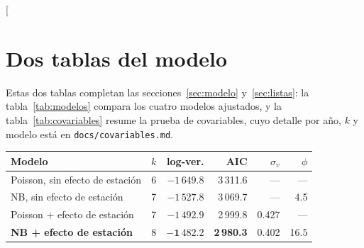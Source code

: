 \documentclass[conference]{IEEEtran}
\begin{document}
\twocolumn[{%
\section{Dos tablas del modelo}
\begin{center}
\begin{minipage}{0.86\textwidth}
\small Estas dos tablas completan las secciones~\ref{sec:modelo} y~\ref{sec:listas}: la tabla~\ref{tab:modelos} compara los cuatro modelos ajustados, y la tabla~\ref{tab:covariables} resume la prueba de covariables, cuyo detalle por año, $k$ y modelo está en \texttt{docs/covariables.md}.
\end{minipage}

\vspace{1.2em}
\begin{minipage}{0.62\textwidth}
\centering
{}
\label{tab:modelos}
\small\setlength\tabcolsep{4pt}
\begin{tabular}{@{}lrrrrr@{}}
\toprule
Modelo & $k$ & log-ver. & AIC & $\sigma_v$ & $\phi$ \\
\midrule
Poisson, sin efecto de estación & 6 & $-1\,649.8$ & 3\,311.6 & --- & --- \\
NB, sin efecto de estación & 7 & $-1\,527.8$ & 3\,069.7 & --- & 4.5 \\
Poisson + efecto de estación & 7 & $-1\,492.9$ & 2\,999.8 & 0.427 & --- \\
\textbf{NB + efecto de estación} & 8 & $\mathbf{-1\,482.2}$ & \textbf{2\,980.3} & 0.402 & 16.5 \\
\bottomrule
\end{tabular}
\end{minipage}


\end{center}}
\end{document}
